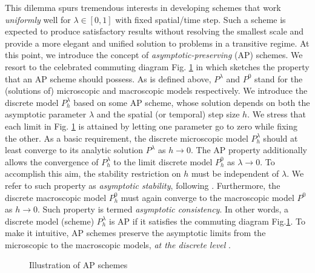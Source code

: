 \documentclass{report}
\begin{document}
 This dilemma spurs tremendous interests in developing schemes that work \emph{uniformly} well for $\lambda \in [0,1]$ with fixed spatial/time step. Such a scheme is expected to produce satisfactory results without resolving the smallest scale and provide a more elegant and unified solution to problems in a transitive regime. At this point, we introduce the concept of \emph{asymptotic-preserving} (AP) schemes. We resort to the celebrated commuting diagram Fig. \ref{fig:illustration_ap} in \cite{jin_1999} which sketches the property that an AP scheme should possess. As is defined above, $P^\lambda$ and $P^0$ stand for the (solutions of) microscopic and macroscopic models respectively. We introduce the discrete model $P^\lambda_h$ based on some AP scheme, whose solution depends on both the asymptotic parameter $\lambda$ and the spatial (or temporal) step size $h$. We stress that each limit in Fig. \ref{fig:illustration_ap} is attained by letting one parameter go to zero while fixing the other. As a basic requirement, the discrete microscopic model $P^\lambda_h$ should at least converge to its analytic solution $P^\lambda$ as $h\rightarrow0$. The AP property additionally allows the convergence of $P^\lambda_h$ to the limit discrete model $P^0_h$ as $\lambda\rightarrow0$. To accomplish this aim, the stability restriction on $h$ must be independent of $\lambda$. We refer to such property as \emph{asymptotic stability}, following \cite{degond_2011}. Furthermore, the discrete macroscopic model $P^0_h$ must again converge to the macroscopic model $P^0$ as $h\rightarrow0$. Such property is termed \emph{asymptotic consistency}. In other words, a discrete model (scheme) $P^\lambda_h$ is AP if it satisfies the commuting diagram Fig.\ref{fig:illustration_ap}. To make it intuitive, AP schemes preserve the asymptotic limits from the microscopic to the macroscopic models, \emph{at the discrete level} \citep{jin_2010}.
 
  \begin{figure}
     \centering
     \caption{Illustration of AP schemes}
     \label{fig:illustration_ap}
 \end{figure}
 
\end{document}
